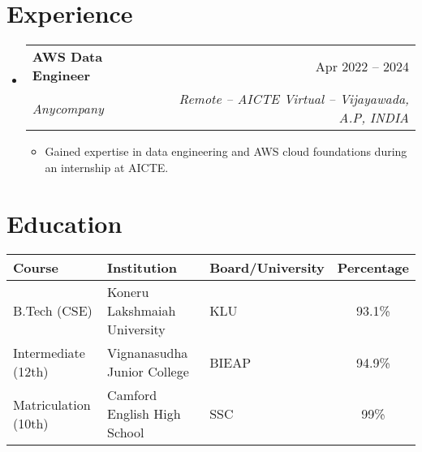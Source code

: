 \documentclass[a4paper,11pt]{article}
\makeatletter
\newcommand{\resumeItem}[1]{
  \item\small{#1}
}
\newcommand{\resumeItemListStart}{\begin{itemize}[rightmargin=0.11in]}
\newcommand{\resumeItemListEnd}{\end{itemize}}
\newcommand{\resumeQuadHeading}[4]{
  \item
  \begin{tabular*}{0.96\textwidth}[t]{l@{\extracolsep{\fill}}r}
    \textbf{#1} & #2 \\
    \textit{\small#3} & \textit{\small #4} \\
  \end{tabular*}
}
\newcommand{\resumeHeadingListStart}{
  \begin{itemize}[leftmargin=0.15in, label={}]
}
\newcommand{\resumeHeadingListEnd}{\end{itemize}}
\makeatother
\begin{document}
\section{Experience}
\resumeHeadingListStart{}
  \resumeQuadHeading{AWS Data Engineer}{Apr 2022 – 2024}
  {Anycompany}{Remote -- AICTE Virtual – Vijayawada, A.P, INDIA}
    \resumeItemListStart{}
      
      \resumeItem{Gained expertise in data engineering and AWS cloud foundations during an internship at AICTE.}
      
    \resumeItemListEnd{}
\resumeHeadingListEnd{}



\section{Education}
\begin{center}
    \renewcommand{\arraystretch}{1.3} %
    \setlength{\tabcolsep}{6pt} %
    \begin{tabularx}{0.93\textwidth} { | X | X | X | c | }
        \hline
        \textbf{Course} & \textbf{Institution} & \textbf{Board/University} & \textbf{Percentage} \\
        \hline
        B.Tech (CSE) & Koneru Lakshmaiah University & KLU & 93.1\% \\
        \hline
        Intermediate (12th) & Vignanasudha Junior College & BIEAP & 94.9\% \\
        \hline
        Matriculation (10th) & Camford English High School & SSC & 99\% \\
        \hline
    \end{tabularx}
\end{center}

\end{document}
